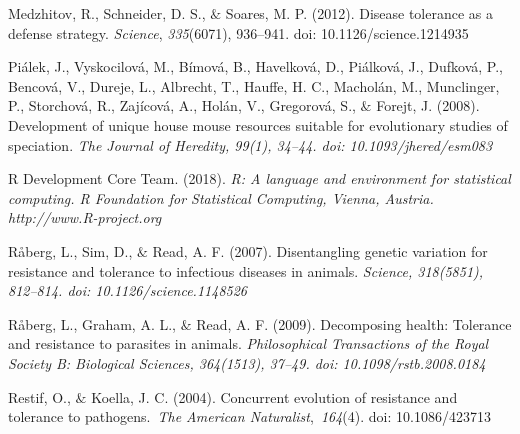 \documentclass[12pt]{article}
\renewcommand{\_}{\kern-1.5pt\textunderscore\kern-1.5pt}
\begin{document}
\begin{FlushLeft}
Medzhitov, R., Schneider, D. S., $\&$  Soares, M. P. (2012). Disease tolerance as a defense strategy. \textit{Science}, \textit{335}(6071), 936–941. doi: 10.1126/science.1214935
\end{FlushLeft}\par

\begin{FlushLeft}
Piálek, J., Vyskocilová, M., Bímová, B., Havelková, D., Piálková, J., Dufková, P., Bencová, V., Dureje, L., Albrecht, T., Hauffe, H. C., Macholán, M., Munclinger, P., Storchová, R., Zajícová, A., Holán, V., Gregorová, S., $\&$  Forejt, J. (2008). Development of unique house mouse resources suitable for evolutionary studies of speciation. \textit{The Journal of Heredity, 99(1), 34–44. doi: 10.1093/jhered/esm083}
\end{FlushLeft}\par

\begin{FlushLeft}
R Development Core Team. (2018). \textit{R: A language and environment for statistical computing. R Foundation for Statistical Computing, Vienna, Austria. http://www.R-project.org}
\end{FlushLeft}\par

\begin{FlushLeft}
Råberg, L., Sim, D., $\&$  Read, A. F. (2007). Disentangling genetic variation for resistance and tolerance to infectious diseases in animals. \textit{Science, 318(5851), 812–814. doi: 10.1126/science.1148526}
\end{FlushLeft}\par

\begin{FlushLeft}
Råberg, L., Graham, A. L., $\&$  Read, A. F. (2009). Decomposing health: Tolerance and resistance to parasites in animals. \textit{Philosophical Transactions of the Royal Society B: Biological Sciences, 364(1513), 37–49. doi: 10.1098/rstb.2008.0184}
\end{FlushLeft}\par

\begin{FlushLeft}
Restif, O., $\&$  Koella, J. C. (2004). Concurrent evolution of resistance and tolerance to pathogens. \textit{The American Naturalist}, \textit{164}(4). doi: 10.1086/423713
\end{FlushLeft}\par
\end{document}
